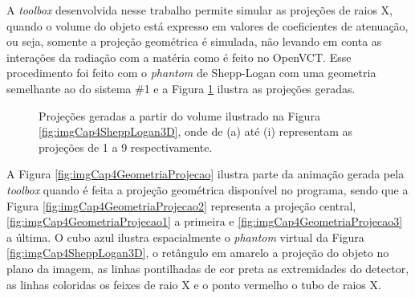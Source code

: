 A \textit{toolbox} desenvolvida nesse trabalho permite simular as projeções de raios X, quando o volume do objeto está expresso em valores de coeficientes de atenuação, ou seja, somente a projeção geométrica é simulada, não levando em conta as interações da radiação com a matéria como é feito no OpenVCT. Esse procedimento foi feito com o \textit{phantom} de Shepp-Logan com uma geometria semelhante ao do sistema \#1 e a Figura \ref{fig:imgCap4Projecoes} ilustra as projeções geradas.

\begin{figure}[htb]
	\centering
	
	\caption{Projeções geradas a partir do volume ilustrado na Figura \ref{fig:imgCap4SheppLogan3D}, onde de (a) até (i) representam as projeções de 1 a 9 respectivamente.}
	
	
	\label{fig:imgCap4Projecoes}
\end{figure}

 
A Figura \ref{fig:imgCap4GeometriaProjecao} ilustra parte da animação gerada pela \textit{toolbox} quando é feita a projeção geométrica  disponível no programa, sendo que a Figura \ref{fig:imgCap4GeometriaProjecao2} representa a projeção central, \ref{fig:imgCap4GeometriaProjecao1} a primeira e \ref{fig:imgCap4GeometriaProjecao3} a última. O cubo azul ilustra espacialmente o \textit{phantom} virtual da Figura \ref{fig:imgCap4SheppLogan3D}, o retângulo em amarelo a projeção do objeto no plano da imagem, as linhas pontilhadas de cor preta as extremidades do detector, as linhas coloridas os feixes de raio X  e o ponto vermelho o tubo de raios X. 

